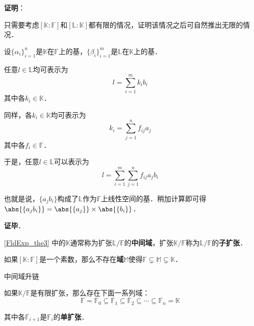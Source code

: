 \textbf{证明}：

只需要考虑$[\mathbb{K}:\mathbb{F}]$和$[\mathbb{L}:\mathbb{K}]$都有限的情况，证明该情况之后可自然推出无限的情况．

设$\{\alpha_i\}_{i=1}^{n}$是$\mathbb{K}$在$\mathbb{F}$上的基，$\{\beta_i\}_{i=1}^{m}$是$\mathbb{L}$在$\mathbb{K}$上的基．

任意$l\in\mathbb{L}$均可表示为
\begin{equation}
l = \sum_{i=1}^m k_ib_i
\end{equation}
其中各$k_i\in\mathbb{K}$．

同样，各$k_i\in\mathbb{K}$均可表示为
\begin{equation}
k_i = \sum_{j=1}^n f_{ij}a_j
\end{equation}
其中各$f_i\in\mathbb{F}$．

于是，任意$l\in\mathbb{L}$可以表示为
\begin{equation}
l = \sum_{i=1}^m \sum_{j=1}^n f_{ij}a_jb_i
\end{equation}

也就是说，$\{a_jb_i\}$构成了$\mathbb{L}$作为$\mathbb{F}$上线性空间的基．稍加计算即可得$\abs{\{a_jb_i\}}=\abs{\{a_j\}}\times\abs{\{b_i\}}$．





\textbf{证毕}．


\autoref{FldExp_the3} 中的$\mathbb{K}$通常称为扩张$\mathbb{L}/\mathbb{F}$的\textbf{中间域}，扩张$\mathbb{K}/\mathbb{F}$称为$\mathbb{L}/\mathbb{F}$的\textbf{子扩张}．






\begin{corollary}{}
如果$[\mathbb{K}:\mathbb{F}]$是一个素数，那么不存在\textbf{域}$\mathbb{M}$使得$\mathbb{F}\subsetneq\mathbb{M}\subsetneq\mathbb{K}$．
\end{corollary}


\begin{corollary}{中间域升链}

如果$\mathbb{K}/\mathbb{F}$是有限扩张，那么存在下面一系列域：
\begin{equation}
\mathbb{F}=\mathbb{F}_0\subseteq\mathbb{F}_1\subseteq\mathbb{F}_2\subseteq\cdots\subseteq\mathbb{F}_n=\mathbb{K}
\end{equation}

其中各$\mathbb{F}_{i+1}$是$\mathbb{F}_i$的\textbf{单扩张}．

\end{corollary}





